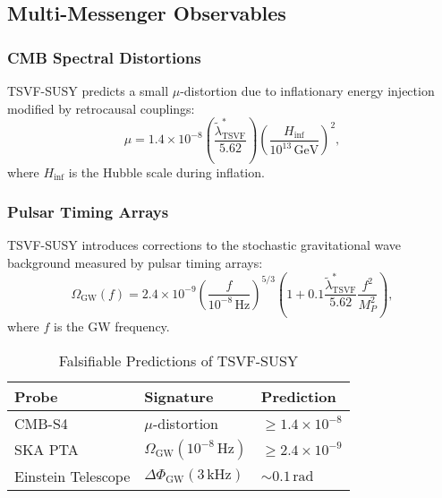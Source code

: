 \documentclass[twocolumn,superscriptaddress,floatfix]{revtex4-2}
\begin{document}
\subsection{Multi-Messenger Observables}
\subsubsection{CMB Spectral Distortions}
TSVF-SUSY predicts a small \(\mu\)-distortion due to inflationary energy injection modified by retrocausal couplings:
\begin{equation}
    \mu = 1.4 \times 10^{-8} \left( \frac{\tilde{\lambda}_{\text{TSVF}}^*}{5.62} \right) \left( \frac{H_{\text{inf}}}{10^{13} \, \text{GeV}} \right)^2,
    \label{eq:cmb_mu}
\end{equation}
where \(H_{\text{inf}}\) is the Hubble scale during inflation.

\subsubsection{Pulsar Timing Arrays}
TSVF-SUSY introduces corrections to the stochastic gravitational wave background measured by pulsar timing arrays:
\begin{equation}
    \Omega_{\text{GW}}(f) = 2.4 \times 10^{-9} \left( \frac{f}{10^{-8} \, \text{Hz}} \right)^{5/3} \left( 1 + 0.1 \frac{\tilde{\lambda}_{\text{TSVF}}^*}{5.62} \frac{f^2}{M_P^2} \right),
    \label{eq:pta}
\end{equation}
where \(f\) is the GW frequency.

\begin{table}[ht]
    \centering
    \caption{Falsifiable Predictions of TSVF-SUSY}
    \begin{tabular}{@{}lll@{}}
        \toprule
        \textbf{Probe} & \textbf{Signature} & \textbf{Prediction} \\
        \midrule
        CMB-S4 & \(\mu\)-distortion & \(\geq 1.4 \times 10^{-8}\) \\
        SKA PTA & \(\Omega_{\text{GW}}(10^{-8} \, \text{Hz})\) & \(\geq 2.4 \times 10^{-9}\) \\
        Einstein Telescope & \(\Delta \Phi_{\text{GW}}(3 \, \text{kHz})\) & \(\sim 0.1 \, \text{rad}\) \\
        \bottomrule
    \end{tabular}
    \label{tab:predictions}
\end{table}

\vspace{0.5cm}
\end{document}
